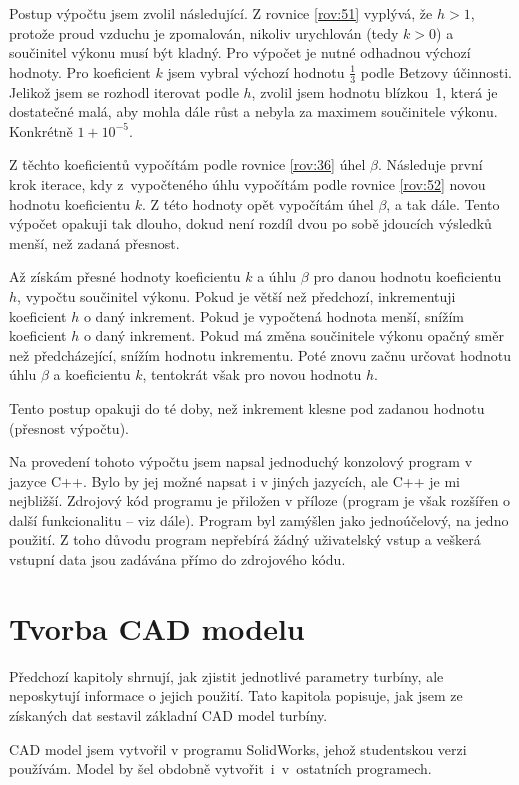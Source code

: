 	Postup výpočtu jsem zvolil následující. Z rovnice \eqref{rov:51} vyplývá, že $h > 1$, protože proud vzduchu je zpomalován, nikoliv urychlován (tedy $k > 0$) a součinitel výkonu musí být kladný. Pro výpočet je nutné odhadnou výchozí hodnoty. Pro koeficient $k$ jsem vybral výchozí hodnotu $\frac{1}{3}$ podle Betzovy účinnosti. Jelikož jsem se rozhodl iterovat podle $h$, zvolil jsem hodnotu blízkou~1, která je dostatečné malá, aby mohla dále růst a nebyla za maximem součinitele výkonu. Konkrétně $1 + 10^{-5}$.
	
	Z těchto koeficientů vypočítám podle rovnice \eqref{rov:36} úhel $\beta$. Následuje první krok iterace, kdy z~vypočteného úhlu vypočítám podle rovnice \eqref{rov:52} novou hodnotu koeficientu $k$. Z této hodnoty opět vypočítám úhel $\beta$, a tak dále. Tento výpočet opakuji tak dlouho, dokud není rozdíl dvou po sobě jdoucích výsledků menší, než zadaná přesnost.
	
	Až získám přesné hodnoty koeficientu $k$ a úhlu $\beta$ pro danou hodnotu koeficientu $h$, vypočtu součinitel výkonu. Pokud je větší než předchozí, inkrementuji koeficient $h$ o daný inkrement. Pokud je vypočtená hodnota menší, snížím koeficient $h$ o daný inkrement. Pokud má změna součinitele výkonu opačný směr než předcházející, snížím hodnotu inkrementu. Poté znovu začnu určovat hodnotu úhlu $\beta$ a koeficientu $k$, tentokrát však pro novou hodnotu $h$.
	
	Tento postup opakuji do té doby, než inkrement klesne pod zadanou hodnotu (přesnost výpočtu).
	
	Na provedení tohoto výpočtu jsem napsal jednoduchý konzolový program v jazyce C++. Bylo by jej možné napsat i v jiných jazycích, ale C++ je mi nejbližší. Zdrojový kód programu je přiložen v příloze (program je však rozšířen o další funkcionalitu – viz dále). Program byl zamýšlen jako jednoúčelový, na jedno použití. Z toho důvodu program nepřebírá žádný uživatelský vstup a veškerá vstupní data jsou zadávána přímo do zdrojového kódu.
	
	\section{Tvorba CAD modelu}\label{kap:model}
	Předchozí kapitoly shrnují, jak zjistit jednotlivé parametry turbíny, ale neposkytují informace o jejich použití. Tato kapitola popisuje, jak jsem ze získaných dat sestavil základní CAD model turbíny.
	
	CAD model jsem vytvořil v programu SolidWorks, jehož studentskou verzi používám. Model by šel obdobně vytvořit~i~v~ostatních programech.
	
